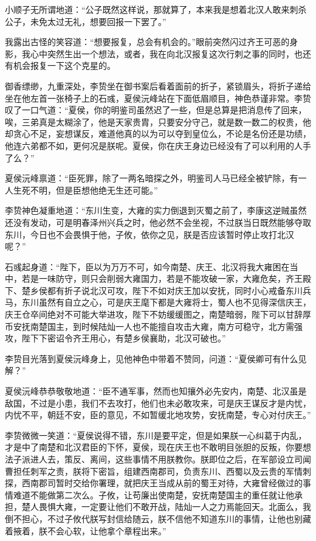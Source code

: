 小顺子无所谓地道：“公子既然这样说，那就算了，本来我是想着北汉人敢来刺杀公子，未免太过无礼，想要回报一下罢了。”

我露出古怪的笑容道：“想要报复，总会有机会的。”眼前突然闪过齐王可恶的身影，我心中突然生出一个想法，或者，我在向北汉报复这次行刺之事的同时，也还有机会报复一下这个克星的。

御香缥缈，九重深处，李贽坐在御书案后看着面前的折子，紧锁眉头，将折子递给坐在他左首一张椅子上的石彧，夏侯沅峰站在下面低眉顺目，神色恭谨非常。李贽叹了一口气道：“夏侯，你的明鉴司虽然迟了一些，但是总算是把消息传了回来，唉，三弟真是太糊涂了，他是天家贵胄，只要安分守己，就是数一数二的权贵，他却贪心不足，妄想谋反，难道他真的以为可以夺到皇位么，不论是名份还是功绩，他连六弟都不如，更何况是朕呢。夏侯，你在庆王身边已经没有了可以利用的人手了么？”

夏侯沅峰禀道：“臣死罪，除了一两名暗探之外，明鉴司人马已经全被铲除，有一人生死不明，但是臣想他绝无生还可能。”

李贽神色凝重地道：“东川生变，大雍的实力倒退到灭蜀之前了，李康这逆贼虽然还没有发动，可是明春泽州兴兵之时，他必然不会坐视，不过朕当日既然能够夺取东川，今日也不会畏惧于他，子攸，依你之见，朕是否应该暂时停止攻打北汉呢？”

石彧起身道：“陛下，臣以为万万不可，如今南楚、庆王、北汉将我大雍困在当中，若是一味防守，则只会削弱大雍国力，若是不能攻破一家，大雍危矣，齐王殿下、楚乡侯都有折子说北汉可攻，陛下不如对庆王加以安抚，同时小心戒备东川兵马，东川虽然有自立之心，可是庆王麾下都是大雍将士，蜀人也不见得深信庆王，庆王仓卒间绝对不可能大举进攻，陛下不妨缓缓图之，南楚暗弱，陛下可以甘辞厚币安抚南楚国主，到时候陆灿一人也不能擅自攻击大雍，南方可稳守，北方需强攻，陛下下密诏令齐王用心，有楚乡侯襄助，北汉可破也。”

李贽目光落到夏侯沅峰身上，见他神色中带着不赞同，问道：“夏侯卿可有什么见解？”

夏侯沅峰恭恭敬敬地道：“臣不通军事，然而也知攘外必先安内，南楚、北汉虽是敌国，不过是小患，我们不去攻打，他们也未必敢攻来，可是庆王谋反才是内忧，内忧不平，朝廷不安，臣的意见，不如暂缓北地攻势，安抚南楚，专心对付庆王。”

李贽微微一笑道：“夏侯说得不错，东川是要平定，但是如果朕一心纠葛于内乱，才是中了南楚和北汉君臣的下怀，夏侯，现在庆王也不敢明目张胆的反叛，你要想法子派进人去，策反、离间，这些事情不用朕教你。朕即位之后，在军部设立司闻曹担任刺军之责，朕将下密旨，组建西南郡司，负责东川、西蜀以及云贵的军情刺探，西南郡司暂时交给你署理，就把庆王当成从前的蜀王对待，大雍曾经做过的事情难道不能做第二次么。子攸，让苟廉出使南楚，安抚南楚国主的重任就让他承担，楚人畏惧大雍，一定要让他们不敢开战，陆灿一人之力焉能回天。北面么，我倒不担心，不过子攸代朕写封信给随云，朕不信他不知道东川的事情，让他也别藏着掖着，朕不会心软，让他拿个章程出来。”

